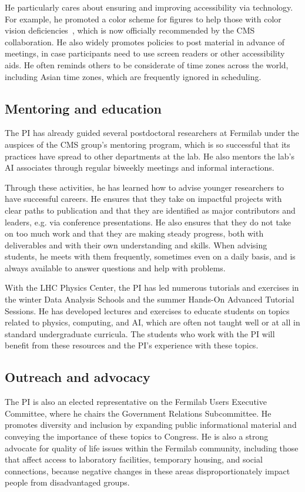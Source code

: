 He particularly cares about ensuring and improving accessibility via technology.
For example, he promoted a color scheme for figures to help those with color vision deficiencies~\cite{Petroff:2021},
which is now officially recommended by the CMS collaboration.
He also widely promotes policies to post material in advance of meetings,
in case participants need to use screen readers or other accessibility aids.
He often reminds others to be considerate of time zones across the world,
including Asian time zones, which are frequently ignored in scheduling.

\subsection{Mentoring and education}

The PI has already guided several postdoctoral researchers at Fermilab
under the auspices of the CMS group's mentoring program,
which is so successful that its practices have spread to other departments at the lab.
He also mentors the lab's AI associates through regular biweekly meetings and informal interactions.

Through these activities, he has learned how to advise younger researchers to have successful careers.
He ensures that they take on impactful projects with clear paths to publication
and that they are identified as major contributors and leaders, e.g. via conference presentations.
He also ensures that they do not take on too much work and that they are making steady progress,
both with deliverables and with their own understanding and skills.
When advising students, he meets with them frequently, sometimes even on a daily basis,
and is always available to answer questions and help with problems.

With the LHC Physics Center, the PI has led numerous tutorials and exercises in the winter Data Analysis Schools
and the summer Hands-On Advanced Tutorial Sessions.
He has developed lectures and exercises to educate students on topics related to physics, computing, and AI,
which are often not taught well or at all in standard undergraduate curricula.
The students who work with the PI will benefit from these resources
and the PI's experience with these topics.

\subsection{Outreach and advocacy}

The PI is also an elected representative on the Fermilab Users Executive Committee,
where he chairs the Government Relations Subcommittee.
He promotes diversity and inclusion by expanding public informational material
and conveying the importance of these topics to Congress.
He is also a strong advocate for quality of life issues within the Fermilab community,
including those that affect access to laboratory facilities, temporary housing, and social connections,
because negative changes in these areas disproportionately impact people from disadvantaged groups.
